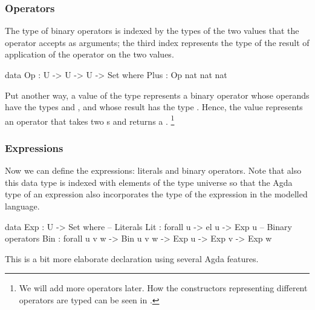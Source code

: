 \subsubsection{Operators}

The type of binary operators is indexed by the types of the two values that
the operator accepts as arguments; the third index represents the type of
the result of application of the operator on the two values.

\begin{code}
  data Op : U -> U -> U -> Set where
    Plus : Op nat nat nat
\end{code}

\noindent Put another way, a value of the type  represents
a binary operator whose operands have the types  and ,
and whose result has the type . Hence, the value 
represents an operator that takes two s and returns a .%
\footnote{We will add more operators later. How the constructors representing
different operators are typed can be seen in .}

\subsubsection{Expressions}

Now we can define the expressions: literals and binary operators.
Note that also this data type is indexed with elements of the type universe
 so that the Agda type of an expression also incorporates the type of
the expression in the modelled language.

\begin{code}
  data Exp : U -> Set where
    -- Literals
    Lit : forall {u} -> el u -> Exp u
    -- Binary operators
    Bin : forall {u v w} -> Bin u v w -> Exp u -> Exp v -> Exp w
\end{code}\label{sec:simple-exp}

\noindent This is a bit more elaborate declaration using several Agda features.

